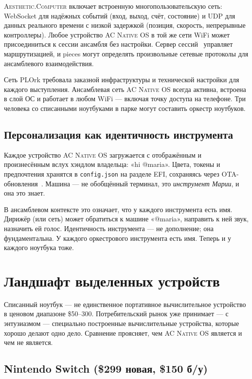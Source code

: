 \documentclass[10pt,letterpaper,twocolumn]{article}
\newcommand{\ac}{\textsc{Aesthetic.Computer}}
\newcommand{\acos}{\textsc{AC Native OS}}
\begin{document}
\ac{} включает встроенную многопользовательскую сеть: WebSocket для надёжных событий (вход, выход, счёт, состояние) и UDP для данных реального времени с низкой задержкой (позиция, скорость, непрерывные контроллеры). Любое устройство \acos{} в той же сети WiFi может присоединиться к сессии ансамбля без настройки. Сервер сессий~\citep{scudder2026ac} управляет маршрутизацией, и pieces могут определять произвольные сетевые протоколы для ансамблевого взаимодействия.

Сеть PLOrk требовала заказной инфраструктуры и технической настройки для каждого выступления. Ансамблевая сеть \acos{} всегда активна, встроена в слой ОС и работает в любом WiFi --- включая точку доступа на телефоне. Три человека со списанными ноутбуками в парке могут составить оркестр ноутбуков.

\subsection{Персонализация как идентичность инструмента}

Каждое устройство \acos{} загружается с отображённым и произнесённым вслух хэндлом владельца: «hi @maria». Цвета, токены и предпочтения хранятся в \texttt{config.json} на разделе EFI, сохраняясь через OTA-обновления~\citep{scudder2026os}. Машина --- не обобщённый терминал, это \emph{инструмент Марии}, и она это знает.

В ансамблевом контексте это означает, что у каждого инструмента есть имя. Дирижёр (или сеть) может обратиться к машине «@maria», направить к ней звук, назначить ей голос. Идентичность инструмента --- не дополнение; она фундаментальна. У каждого оркестрового инструмента есть имя. Теперь и у каждого ноутбука тоже.


\section{Ландшафт выделенных устройств}
\label{sec:devices}

Списанный ноутбук --- не единственное портативное вычислительное устройство в ценовом диапазоне \$50--300. Потребительский рынок уже принимает --- с энтузиазмом --- специально построенные вычислительные устройства, которые хорошо делают одно дело. Сравнение проясняет, чем \acos{} является и чем не является.

\subsection{Nintendo Switch (\$299 новая, \$150 б/у)}
\end{document}
